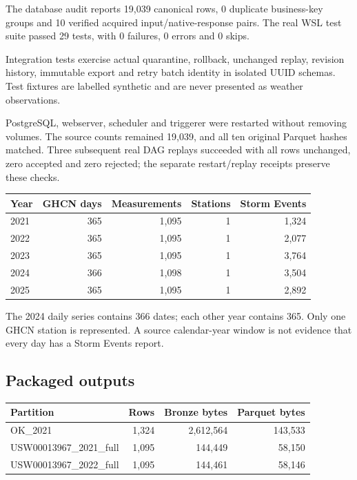 The database audit reports 19,039 canonical rows, 0 duplicate business-key groups and 10 verified acquired input/native-response pairs. The real WSL test suite passed 29 tests, with 0 failures, 0 errors and 0 skips.

Integration tests exercise actual quarantine, rollback, unchanged replay, revision history, immutable export and retry batch identity in isolated UUID schemas. Test fixtures are labelled synthetic and are never presented as weather observations.

PostgreSQL, webserver, scheduler and triggerer were restarted without removing volumes. The source counts remained 19,039, and all ten original Parquet hashes matched. Three subsequent real DAG replays succeeded with all rows unchanged, zero accepted and zero rejected; the separate restart/replay receipts preserve these checks.

\begin{tabularx}{\textwidth}{@{}lrrrr@{}}\toprule Year & GHCN days & Measurements & Stations & Storm Events\\\midrule

2021 & 365 & 1,095 & 1 & 1,324\\

2022 & 365 & 1,095 & 1 & 2,077\\

2023 & 365 & 1,095 & 1 & 3,764\\

2024 & 366 & 1,098 & 1 & 3,504\\

2025 & 365 & 1,095 & 1 & 2,892\\

\bottomrule\end{tabularx}

The 2024 daily series contains 366 dates; each other year contains 365. Only one GHCN station is represented. A source calendar-year window is not evidence that every day has a Storm Events report.

\subsection{Packaged outputs}

\begin{tabularx}{\textwidth}{@{}Yrrr@{}}\toprule Partition & Rows & Bronze bytes & Parquet bytes\\\midrule

OK\_2021 & 1,324 & 2,612,564 & 143,533\\

USW00013967\_2021\_full & 1,095 & 144,449 & 58,150\\

USW00013967\_2022\_full & 1,095 & 144,461 & 58,146\\

\bottomrule\end{tabularx}

